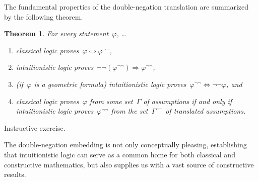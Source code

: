 \documentclass[10pt,reqno,a4paper,openany]{amsbook}
\makeatletter
\theoremstyle{definition}
\theoremstyle{plain}
\newtheorem{thm}[defn]{Theorem}
\theoremstyle{remark}
\newcommand{\?}{\,{:}\,}
\renewcommand{\_}{\mathpunct{.}\,}
\renewenvironment{proof}[1][\proofname]{\par
  \pushQED{\qed}%
  \normalfont \topsep6\p@\@plus6\p@\relax
  \trivlist
  \item[\hskip\labelsep
        \itshape
    #1\@addpunct{.}]\ignorespaces
}{%
  \popQED\endtrivlist\@endpefalse
}
\makeatother
\begin{document}
The fundamental properties of the double-negation translation are summarized by
the following theorem.

\begin{thm}\label{thm:negneg}
For every statement~$\varphi$, \ldots
\begin{enumerate}
\item classical logic proves~$\varphi \Leftrightarrow \varphi^{\neg\neg}$,
\item intuitionistic logic proves~$\neg\neg(\varphi^{\neg\neg}) \Rightarrow
\varphi^{\neg\neg}$,
\item (if~$\varphi$ is a geometric formula) intuitionistic logic
proves~$\varphi^{\neg\neg} \Leftrightarrow \neg\neg\varphi$, and
\item classical logic proves~$\varphi$ from some set~$\Gamma$ of assumptions
if and only if intuitionistic logic proves~$\varphi^{\neg\neg}$ from the
set~$\Gamma^{\neg\neg}$ of translated assumptions.
\end{enumerate}
\end{thm}

\begin{proof}Instructive exercise.\end{proof}

The double-negation embedding is not only conceptually pleasing, establishing
that intuitionistic logic can serve as a common home for both classical and
constructive mathematics, but also supplies us with a vast source of
constructive results.
\end{document}
